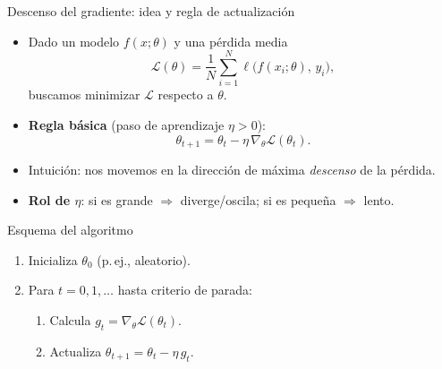 \documentclass[10pt]{beamer}
\begin{document}
\begin{frame}{Descenso del gradiente: idea y regla de actualizaci\'on}
\begin{itemize}
  \item Dado un modelo $f(x;\theta)$ y una p\'erdida media
  \[
    \mathcal{L}(\theta)=\frac{1}{N}\sum_{i=1}^{N}\ell\!\big(f(x_i;\theta),\,y_i\big),
  \]
  buscamos minimizar $\mathcal{L}$ respecto a $\theta$.
  \item \textbf{Regla b\'asica} (paso de aprendizaje $\eta>0$):
  \[
    \theta_{t+1}=\theta_t-\eta\,\nabla_{\theta}\mathcal{L}(\theta_t).
  \]
  \item Intuici\'on: nos movemos en la direcci\'on de m\'axima \emph{descenso} de la p\'erdida.
  \item \textbf{Rol de $\eta$}: si es grande $\Rightarrow$ diverge/oscila; si es peque\~na $\Rightarrow$ lento.
\end{itemize}
\vspace{1mm}
\begin{block}{Esquema del algoritmo}
\small
\begin{enumerate}
  \item Inicializa $\theta_0$ (p.\,ej., aleatorio).
  \item Para $t=0,1,\dots$ hasta criterio de parada:
  \begin{enumerate}
    \item Calcula $g_t=\nabla_{\theta}\mathcal{L}(\theta_t)$.
    \item Actualiza $\theta_{t+1}=\theta_t-\eta\,g_t$.
  \end{enumerate}
\end{enumerate}
\end{block}
\end{frame}
\end{document}
